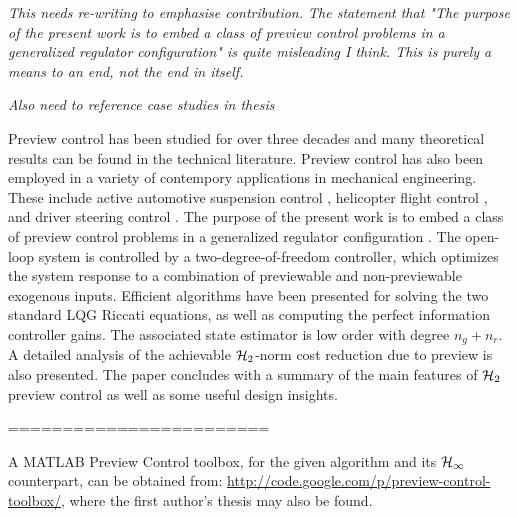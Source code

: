 \label{sec:Conclusions}
\textit{This needs re-writing to emphasise contribution. The statement that "The purpose of the present work
is to embed a class of preview control problems in a generalized regulator
configuration" is quite misleading I think. This is purely a means to an end, not the end in itself. }

\textit{Also need to reference case studies in thesis}


Preview control has been studied for over three decades and many theoretical results can be found in the technical literature. Preview control has also been employed in a variety of contempory applications in mechanical engineering. These include active automotive suspension control \cite{Roh_1999_Stoc_Opt_Prev,Marzbanrad_2004_SuspPrev}, helicopter flight control \cite{Paulino_2006_PreviewRotorcraftAffine}, 
and driver steering control \cite{Cole_2006_PredictiveAndPreviewSteeringControl}. The purpose of the present work is to embed a class of preview control problems in a generalized regulator configuration \cite{LimebeerGreen,ZDG}. The open-loop system is controlled by a two-degree-of-freedom controller, which optimizes the system response to a combination of previewable and non-previewable exogenous inputs. Efficient algorithms have been presented for solving the two standard LQG Riccati equations, as well as computing the perfect information controller gains. The associated state estimator is low order with degree $n_g+n_r$. A detailed analysis of the achievable $\mathcal H_2$-norm cost reduction due to preview is also presented. The paper concludes with a summary of the main features of $\mathcal H_2$ preview control as well as some useful design insights.

========================

A MATLAB Preview Control toolbox, for the given algorithm and its $\mathcal H_\infty$ counterpart, can be obtained from: %
\url{http://code.google.com/p/preview-control-toolbox/}, where the first author's thesis may also be found.




